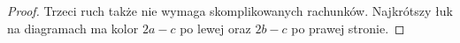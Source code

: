 \begin{proof}
\begin{comment}
            \strand[semithick] (4,10) .. controls (4, 4) and (1, 4) .. (1,0);
            \strand[semithick] (-4,-10) .. controls (-4,-4) and (-1,-4) .. (-1,0);
            \strand[semithick] (-4,10) .. controls (-4, 4) and (-1,4) .. (-1,0);
        \end{knot}
        \end{tikzpicture}}
    \]
\end{comment}
    Trzeci ruch także nie wymaga skomplikowanych rachunków.
    Najkrótszy łuk na diagramach ma kolor $2a-c$ po lewej oraz $2b-c$ po prawej stronie.
\begin{comment}
    \[
     \fbox{
        \begin{tikzpicture}[baseline=-0.65ex,scale=0.07]
        \begin{knot}[clip width=5, flip crossing/.list={1,2,3}]
            \node[darkblue] at (-10, 10) [above] {$b$};
            \node[darkblue] at (10, 10) [above] {$c$};
            \node[darkblue] at (-10, -10) [below] {$2a-2b+c$};
            \node[darkblue] at (10, -10) [below] {$2a-b$};
            \node[darkblue] at (-10, -2) [left] {$a$};
            \strand[semithick] (-10,-10) -- (10,10);
            \strand[semithick] (-10,10) -- (10,-10);
            \strand[semithick] (-10,-2) .. controls (-4, -2) and (-4,8) .. (0,8);
            \strand[semithick] (10,-2) .. controls (4, -2) and (4,8) .. (0,8);
        \end{knot}
        \end{tikzpicture}
        $\stackrel{R_3}{\cong} \,\,$
        \begin{tikzpicture}[baseline=-0.65ex,scale=0.07]
        \begin{knot}[clip width=5, flip crossing/.list={1,2,3}]
            \node[darkblue] at (-10, 10) [above] {$b$};
            \node[darkblue] at (10, 10) [above] {$c$};
            \node[darkblue] at (-10, -10) [below] {$2a-2b+c$};
            \node[darkblue] at (10, -10) [below] {$2a-b$};
            \node[darkblue] at (10, 2) [right] {$a$};
            \strand[semithick] (-10,-10) -- (10,10);
            \strand[semithick] (-10,10) -- (10,-10);
            \strand[semithick] (-10,2) .. controls (-4, 2) and (-4,-8) .. (0,-8);
            \strand[semithick] (10,2) .. controls (4, 2) and (4,-8) .. (0,-8);
        \end{knot}
        \end{tikzpicture}} \qedhere
    \]
\end{comment}
\end{proof}

